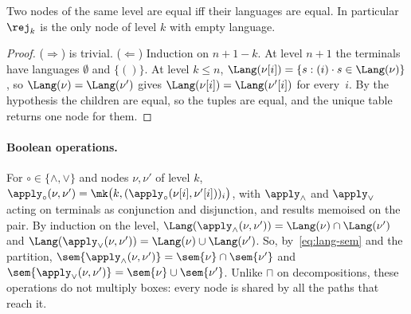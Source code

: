 \begin{lemma}[canonicity]\label{lem:diag-canonical}
Two nodes of the same level are equal iff their languages are equal. In
particular $\rej_k$ is the only node of level $k$ with empty language.
\end{lemma}

\begin{proof}
($\Rightarrow$) is trivial. ($\Leftarrow$) Induction on $n+1-k$. At level
$n+1$ the terminals have languages $\emptyset$ and $\{()\}$. At level $k\le n$,
$\Lang(\nu[i]) = \{ s : (i)\cdot s \in \Lang(\nu)\}$, so
$\Lang(\nu)=\Lang(\nu')$ gives $\Lang(\nu[i])=\Lang(\nu'[i])$ for every~$i$.
By the hypothesis the children are equal, so the tuples are equal, and the
unique table returns one node for them.
\end{proof}

\paragraph{Boolean operations.}
For $\circ\in\{\wedge,\vee\}$ and nodes $\nu,\nu'$ of level $k$,
$\apply_\circ(\nu,\nu') = \mk\bigl(k, (\apply_\circ(\nu[i],\nu'[i]))_{i}\bigr)$,
with $\apply_\wedge$ and $\apply_\vee$ acting on terminals as conjunction and
disjunction, and results memoised on the pair. By induction on the level,
$\Lang(\apply_\wedge(\nu,\nu')) = \Lang(\nu)\cap\Lang(\nu')$ and
$\Lang(\apply_\vee(\nu,\nu')) = \Lang(\nu)\cup\Lang(\nu')$. So,
by~\eqref{eq:lang-sem} and the partition, $\sem{\apply_\wedge(\nu,\nu')} =
\sem{\nu}\cap\sem{\nu'}$ and $\sem{\apply_\vee(\nu,\nu')} =
\sem{\nu}\cup\sem{\nu'}$. Unlike $\sqcap$ on decompositions, these operations
do not multiply boxes: every node is shared by all the paths that reach it.

